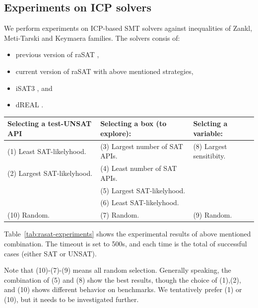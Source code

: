\documentclass[runningheads,a4paper,oribibl]{llncs}
\begin{document}
\subsection{Experiments on ICP solvers} \label{sec:expstrategy}

We perform experiments on ICP-based SMT solvers against inequalities of Zankl, Meti-Tarski and Keymaera families. The solvers consis of:

\begin{itemize}
\item previous version of raSAT \cite{VanKhanh201227},
\item current version of raSAT with above mentioned strategies,
\item iSAT3 \cite{isat}, and
\item dREAL \cite{dRealCADE13}.
\end{itemize}
 

\medskip
{\centering
\begin{tabular}{l|l|l}
Selecting a test-UNSAT API~~ & Selecting a box (to explore): & 
Selcting a variable: \\  %
\hline

(1) Least SAT-likelyhood. & 
(3) Largest number of SAT APIs.~~ & 
(8) Largest sensitibity. \\

(2) Largest SAT-likelyhood. & 
(4) Least number of SAT APIs. & \\

& (5) Largest SAT-likelyhood. & \\

& (6) Least SAT-likelyhood. & \\

(10) Random. & (7) Random. & (9) Random. \\
\end{tabular}
}
\medskip

Table~\ref{tab:rasat-experiments} shows the experimental results of above mentioned combination. 
The timeout is set to 500s, and each time is the total of successful cases 
(either SAT or UNSAT). 

Note that (10)-(7)-(9) means all random selection. 
Generally speaking, the combination of (5) and (8) show the best results, 
though the choice of (1),(2), and (10) shows different behavior on benchmarks. 
We tentatively prefer (1) or (10), but it needs to be investigated further. 
\end{document}
